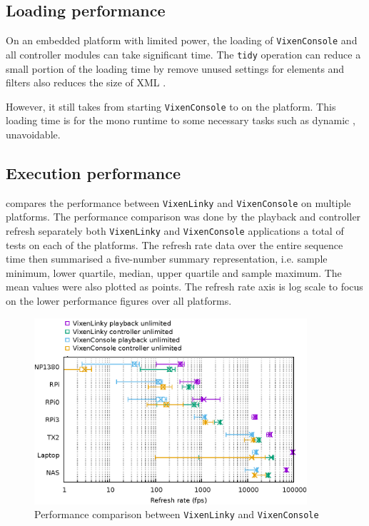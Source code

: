 
\subsection{Loading performance}

On an embedded platform with limited  power, the loading of \texttt{VixenConsole} and all controller modules can take significant time. The \texttt{tidy} operation can reduce a small portion of the loading time by remove unused settings for elements and filters also reduces the size of XML .

However, it still takes  from starting \texttt{VixenConsole} to  on the  platform. This loading time is for the mono runtime to  some necessary tasks such as  dynamic ,  unavoidable.

\subsection{Execution performance}

 compares the performance between \texttt{VixenLinky} and \texttt{VixenConsole} on multiple platforms. The performance comparison was done by  the playback and controller refresh  separately  both \texttt{VixenLinky} and \texttt{VixenConsole} applications\ca{;} a total of  tests on each of the platforms. The refresh rate data over the entire sequence time  then summarised  a five-number summary representation, i.e. sample minimum, lower quartile, median, upper quartile and sample maximum. The mean values were also plotted as points. The refresh rate axis is  log scale to focus on the lower performance figures over all platforms.

\begin{figure}[t]
  \centering
  \includegraphics[width=0.9\textwidth]{Figs/raw-seq-p-c.eps}
  \caption{\footnotesize Performance comparison between \texttt{VixenLinky} and \texttt{VixenConsole}}
  \label{fig:raw-seq-p-c}
\end{figure}

